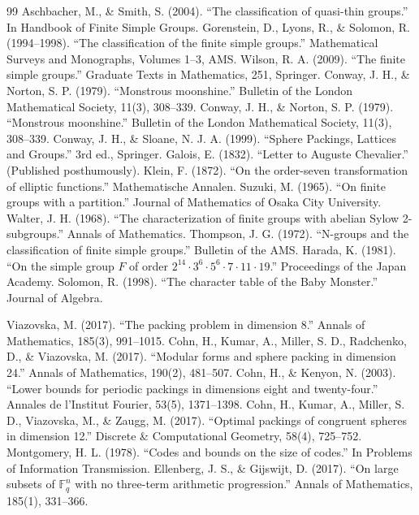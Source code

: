 \begin{thebibliography}{99}
 Aschbacher, M., \& Smith, S. (2004). ``The classification of quasi-thin groups.'' In Handbook of Finite Simple Groups.
 Gorenstein, D., Lyons, R., \& Solomon, R. (1994--1998). ``The classification of the finite simple groups.'' Mathematical Surveys and Monographs, Volumes 1--3, AMS.
 Wilson, R. A. (2009). ``The finite simple groups.'' Graduate Texts in Mathematics, 251, Springer.
 Conway, J. H., \& Norton, S. P. (1979). ``Monstrous moonshine.'' Bulletin of the London Mathematical Society, 11(3), 308--339.
 Conway, J. H., \& Norton, S. P. (1979). ``Monstrous moonshine.'' Bulletin of the London Mathematical Society, 11(3), 308--339.
 Conway, J. H., \& Sloane, N. J. A. (1999). ``Sphere Packings, Lattices and Groups.'' 3rd ed., Springer.
 Galois, E. (1832). ``Letter to Auguste Chevalier.'' (Published posthumously).
 Klein, F. (1872). ``On the order-seven transformation of elliptic functions.'' Mathematische Annalen.
 Suzuki, M. (1965). ``On finite groups with a partition.'' Journal of Mathematics of Osaka City University.
 Walter, J. H. (1968). ``The characterization of finite groups with abelian Sylow 2-subgroups.'' Annals of Mathematics.
 Thompson, J. G. (1972). ``N-groups and the classification of finite simple groups.'' Bulletin of the AMS.
 Harada, K. (1981). ``On the simple group $F$ of order $2^{14} \cdot 3^6 \cdot 5^6 \cdot 7 \cdot 11 \cdot 19$.'' Proceedings of the Japan Academy.
 Solomon, R. (1998). ``The character table of the Baby Monster.'' Journal of Algebra.

 Viazovska, M. (2017). ``The packing problem in dimension 8.'' Annals of Mathematics, 185(3), 991--1015.
 Cohn, H., Kumar, A., Miller, S. D., Radchenko, D., \& Viazovska, M. (2017). ``Modular forms and sphere packing in dimension 24.'' Annals of Mathematics, 190(2), 481--507.
 Cohn, H., \& Kenyon, N. (2003). ``Lower bounds for periodic packings in dimensions eight and twenty-four.'' Annales de l'Institut Fourier, 53(5), 1371--1398.
 Cohn, H., Kumar, A., Miller, S. D., Viazovska, M., \& Zaugg, M. (2017). ``Optimal packings of congruent spheres in dimension 12.'' Discrete \& Computational Geometry, 58(4), 725--752.
 Montgomery, H. L. (1978). ``Codes and bounds on the size of codes.'' In Problems of Information Transmission.
 Ellenberg, J. S., \& Gijswijt, D. (2017). ``On large subsets of $\mathbb{F}_q^n$ with no three-term arithmetic progression.'' Annals of Mathematics, 185(1), 331--366.


\end{thebibliography}
